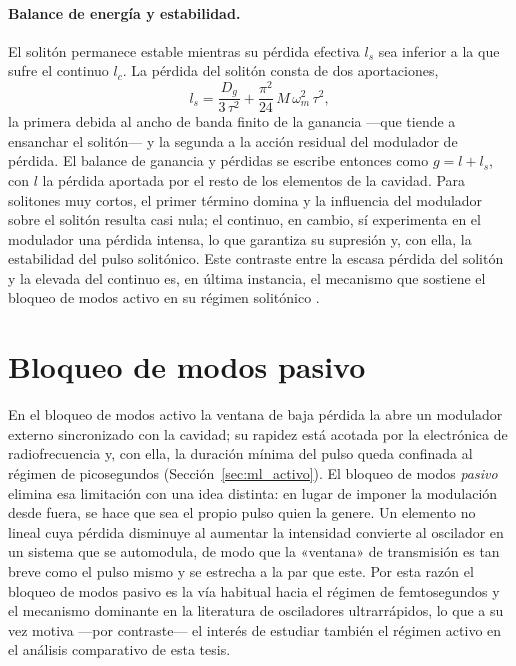 \paragraph{Balance de energía y estabilidad.}
El solitón permanece estable mientras su pérdida efectiva $l_s$ sea inferior a la
que sufre el continuo $l_c$. La pérdida del solitón consta de dos aportaciones,
%
\begin{equation}
    l_s = \frac{D_g}{3\,\tau^2}
        + \frac{\pi^2}{24}\,M\,\omega_m^2\,\tau^2,
    \label{eq:perdida_soliton}
\end{equation}
%
la primera debida al ancho de banda finito de la ganancia —que tiende a ensanchar
el solitón— y la segunda a la acción residual del modulador de pérdida. El balance
de ganancia y pérdidas se escribe entonces como $g = l + l_s$, con $l$ la pérdida
aportada por el resto de los elementos de la cavidad. Para solitones muy cortos, el
primer término domina y la influencia del modulador sobre el solitón resulta casi
nula; el continuo, en cambio, sí experimenta en el modulador una pérdida intensa,
lo que garantiza su supresión y, con ella, la estabilidad del pulso solitónico.
Este contraste entre la escasa pérdida del solitón y la elevada del continuo es,
en última instancia, el mecanismo que sostiene el bloqueo de modos activo en su
régimen solitónico \cite{Haus2000,Keller2022}.



\section{Bloqueo de modos pasivo}
\label{sec:ml_pasivo}

En el bloqueo de modos activo la ventana de baja pérdida la abre un modulador
externo sincronizado con la cavidad; su rapidez está acotada por la electrónica de
radiofrecuencia y, con ella, la duración mínima del pulso queda confinada al
régimen de picosegundos (Sección~\ref{sec:ml_activo}). El bloqueo de modos
\emph{pasivo} elimina esa limitación con una idea distinta: en lugar de imponer la
modulación desde fuera, se hace que sea el propio pulso quien la genere. Un
elemento no lineal cuya pérdida disminuye al aumentar la intensidad convierte al
oscilador en un sistema que se automodula, de modo que la «ventana» de
transmisión es tan breve como el pulso mismo y se estrecha a la par que este. Por
esta razón el bloqueo de modos pasivo es la vía habitual hacia el régimen de
femtosegundos y el mecanismo dominante en la literatura de osciladores
ultrarrápidos, lo que a su vez motiva —por contraste— el interés de estudiar
también el régimen activo en el análisis comparativo de esta tesis.

